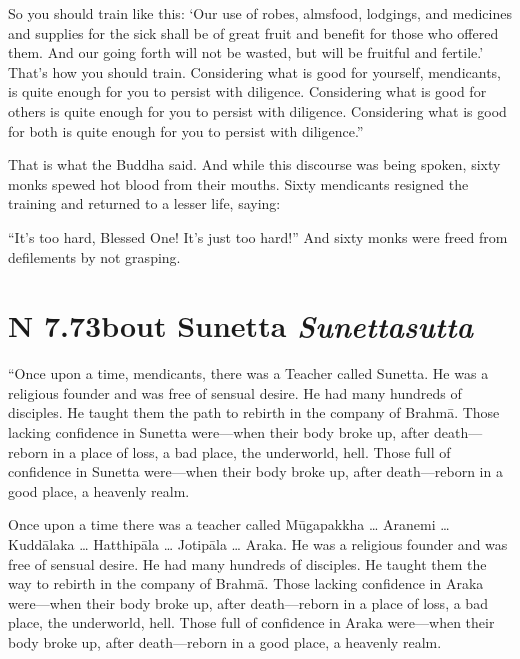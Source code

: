\documentclass[12pt,openany]{book}%
\newcommand*{\suttatitleacronym}[1]{\smaller[2]{#1}\vspace*{.3em}}
\newcommand*{\suttatitletranslation}[1]{\linebreak{#1}}
\newcommand*{\suttatitleroot}[1]{\linebreak\smaller[2]\itshape{#1}}
\newcommand*{\tocacronym}[1]{\hspace*{-3.3em}{#1}\quad}
\newcommand*{\toctranslation}[1]{#1}
\newcommand*{\tocroot}[1]{(\textit{#1})}
\begin{document}
So you should train like this: ‘Our use of robes, almsfood, lodgings, and medicines and supplies for the sick shall be of great fruit and benefit for those who offered them. And our going forth will not be wasted, but will be fruitful and fertile.’ That’s how you should train. Considering what is good for yourself, mendicants, is quite enough for you to persist with diligence. Considering what is good for others is quite enough for you to persist with diligence. Considering what is good for both is quite enough for you to persist with diligence.” 

That is what the Buddha said. And while this discourse was being spoken, sixty monks spewed hot blood from their mouths. Sixty mendicants resigned the training and returned to a lesser life, saying: 

“It’s too hard, Blessed One! It’s just too hard!” And sixty monks were freed from defilements by not grasping. 

%
\section*{{\suttatitleacronym AN 7.73}{\suttatitletranslation About Sunetta }{\suttatitleroot Sunettasutta}}
\addcontentsline{toc}{section}{\tocacronym{AN 7.73} \toctranslation{About Sunetta } \tocroot{Sunettasutta}}

“Once upon a time, mendicants, there was a Teacher called Sunetta. He was a religious founder and was free of sensual desire. He had many hundreds of disciples. He taught them the path to rebirth in the company of \textsanskrit{Brahmā}. Those lacking confidence in Sunetta were—when their body broke up, after death—reborn in a place of loss, a bad place, the underworld, hell. Those full of confidence in Sunetta were—when their body broke up, after death—reborn in a good place, a heavenly realm. 

Once upon a time there was a teacher called \textsanskrit{Mūgapakkha} … Aranemi … \textsanskrit{Kuddālaka} … \textsanskrit{Hatthipāla} … \textsanskrit{Jotipāla} … Araka. He was a religious founder and was free of sensual desire. He had many hundreds of disciples. He taught them the way to rebirth in the company of \textsanskrit{Brahmā}. Those lacking confidence in Araka were—when their body broke up, after death—reborn in a place of loss, a bad place, the underworld, hell. Those full of confidence in Araka were—when their body broke up, after death—reborn in a good place, a heavenly realm. 
\end{document}
